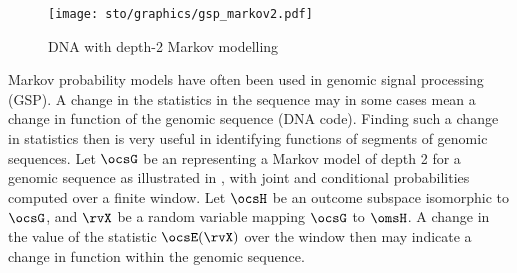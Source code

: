 \begin{tabstr}{0.75}
\begin{figure}[h]
  \gsize%
  \centering%
  \texttt{[image: sto/graphics/gsp\_markov2.pdf]}
  \caption{DNA with depth-2 Markov modelling \label{fig:gsp_markov2}}
\end{figure}
\begin{example}
\label{ex:gsp_markov2}
Markov probability models have often been used in genomic signal processing (GSP).
A change in the statistics in the sequence may in some cases mean a change in function of the genomic sequence (DNA code).
Finding such a change in statistics then is very useful in identifying functions of segments of genomic sequences.
Let $\ocsG$ be an   representing a 
Markov model of depth 2 for a genomic sequence as illustrated in ,
with joint and conditional probabilities computed over a finite window.
Let $\ocsH$ be an outcome subspace isomorphic to $\ocsG$, and 
$\rvX$ be a random variable mapping $\ocsG$ to $\omsH$.
A change in the value of the statistic $\ocsE(\rvX)$ over the window then may indicate a change in function
within the genomic sequence.
\end{example}



\end{tabstr}


